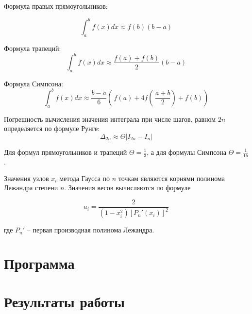 \documentclass[12pt, a4paper]{article}
\begin{document}
Формула правых прямоугольников:

\begin{equation}
	\int_a^bf(x)dx \approx f(b) (b - a)
	\label{eqn:rect} 
\end{equation}

Формула трапеций:
\begin{equation}
	\int_a^b f(x) dx \approx \frac{f(a) + f(b)}{2}(b - a)
	\label{eqn:trap}
\end{equation}

Формула Симпсона:
\begin{equation}
	\int_{a}^{b} f(x) dx \approx \frac{b - a}{6} 
	\left(\, 
		f(a) + 4f
		\left(\, 
			\frac{a + b}{2}
		\right)
		 + f(b)
	\right)
\end{equation}

Погрешность вычисления значения интеграла при числе шагов, равном $2n$ 
определяется по формуле Рунге:
\begin{equation}
	\Delta_{2n} \approx \Theta |I_{2n} - I_n|
	\label{eqn:runge}
\end{equation}

Для формул прямоугольников и трапеций $\Theta = \frac{1}{3}$, а для формулы
Симпсона $\Theta = \frac{1}{15}$.

Значения узлов $x_i$ метода Гаусса по $n$ точкам являются корнями полинома Лежандра
степени $n$. Значения весов вычисляются по формуле 

\begin{equation}
	a_i = \frac{2}{(1 - x_i^2)[P_n'(x_i)]^2}
	\label{eqn:gauss_a}
\end{equation}

где $P_n'$ -- первая производная полинома Лежандра.

\section{Программа}



\section{Результаты работы}
\end{document}

